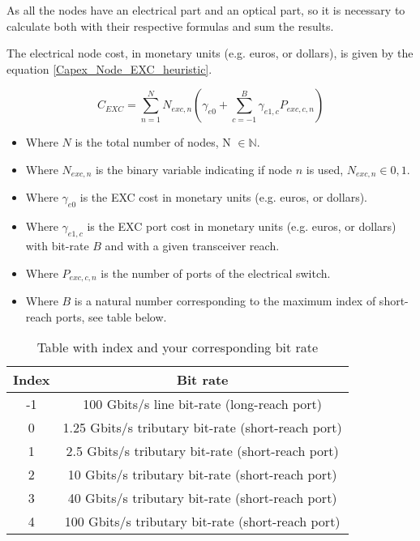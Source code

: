 \vspace{11pt}
As all the nodes have an electrical part and an optical part, so it is necessary to calculate both with their respective formulas and sum the results.

The electrical node cost, in monetary units (e.g. euros, or dollars), is given by the equation \ref{Capex_Node_EXC_heuristic}.

\begin{equation}
C_{EXC} = \sum_{n=1}^{N} N_{exc,n} \left( \gamma_{e0} + \sum_{c=-1}^B \gamma_{e1,c} P_{exc,c,n} \right)
\label{Capex_Node_EXC_heuristic}
\end{equation}

\begin{itemize}
\item Where {$N$ is the total number of nodes, N $\in \mathbb{N}$}.
\item Where {$N_{exc,n}$ is the binary variable indicating if node $n$ is used, $N_{exc,n} \in {0, 1}$}.
\item Where {$\gamma_{e0}$ is the EXC cost in monetary units (e.g. euros, or dollars)}.
\item Where {$\gamma_{e1,c}$ is the EXC port cost in monetary units (e.g. euros, or dollars) with bit-rate $B$ and with a given transceiver reach}.
\item Where {$P_{exc,c,n}$ is the number of ports of the electrical switch}.
\item Where {$B$ is a natural number corresponding to the maximum index of short-reach ports, see table below}.
\end{itemize}

\begin{table}[H]
\centering
\begin{tabular}{|c|c|}
  \hline
  Index & Bit rate \\
 \hline\hline
  -1 & 100 Gbits/s line bit-rate (long-reach port) \\
  0 & 1.25 Gbits/s tributary bit-rate (short-reach port) \\
  1 & 2.5 Gbits/s tributary bit-rate (short-reach port) \\
  2 & 10 Gbits/s tributary bit-rate (short-reach port) \\
  3 & 40 Gbits/s tributary bit-rate (short-reach port) \\
  4 & 100 Gbits/s tributary bit-rate (short-reach port) \\
  \hline
\end{tabular}
\caption{Table with index and your corresponding bit rate}
\label{table_bitrate}
\end{table}

